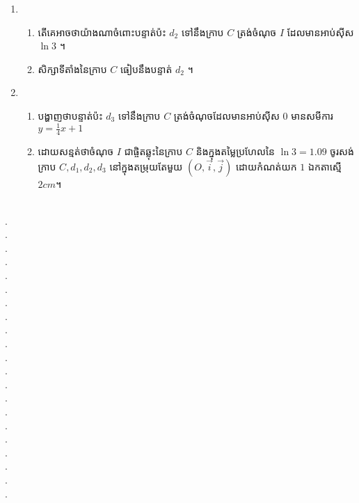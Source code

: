 \documentclass{officialexam}
\begin{document}
\begin{enumerate}[I]
\begin{enumerate}[1]
\begin{enumerate}[k]
			\end{enumerate}
			\item \begin{enumerate}[k]
				\item តើគេអាចថាយ៉ាងណាចំពោះបន្ទាត់ប៉ះ $d_2$ ទៅនឹងក្រាប $C$ ត្រង់ចំណុច $I$ ដែលមានអាប់ស៊ីស $\ln3$ ។
				\item សិក្សាទីតាំងនៃក្រាប $C$ ធៀបនឹងបន្ទាត់ $d_2$ ។
			\end{enumerate}
			\item \begin{enumerate}[k]
				\item បង្ហាញថាបន្ទាត់ប៉ះ $d_3$ ទៅនឹងក្រាប $C$ ត្រង់ចំណុចដែលមានអាប់ស៊ីស $0$ មានសមីការ $y=\frac{1}{4}x+1$
				\item ដោយសន្មត់ថាចំណុច $I$ ជាផ្ចិតឆ្លុះនៃក្រាប $C$ និងក្នុងតម្លៃប្រហែលនៃ $\ln3=1.09$ ចូរសង់ក្រាប $C, d_1, d_2, d_3$ នៅក្នុងតម្រុយតែមួយ $\left(O,\vec{i}, \vec{j}\right)$ ដោយកំណត់យក $1$ ឯកតាស្មើ $2cm$។
			\end{enumerate}
		\end{enumerate}
	\end{enumerate}
	\borderline{\bigg[ចម្លើយ\bigg]}\\
	{\color{white}.}\dotfill\\
	{\color{white}.}\dotfill\\
	{\color{white}.}\dotfill
	\\
	{\color{white}.}\dotfill\\
	{\color{white}.}\dotfill\\
	{\color{white}.}\dotfill
	\\
	{\color{white}.}\dotfill\\
	{\color{white}.}\dotfill\\
	{\color{white}.}\dotfill
	\\
	{\color{white}.}\dotfill\\
	{\color{white}.}\dotfill\\
	{\color{white}.}\dotfill
	\\
	{\color{white}.}\dotfill\\
	{\color{white}.}\dotfill\\
	{\color{white}.}\dotfill
	\\
	{\color{white}.}\dotfill\\
	{\color{white}.}\dotfill\\
	{\color{white}.}\dotfill
	\\
	{\color{white}.}\dotfill\\
	{\color{white}.}\dotfill\\
	{\color{white}.}\dotfill
\end{document}
